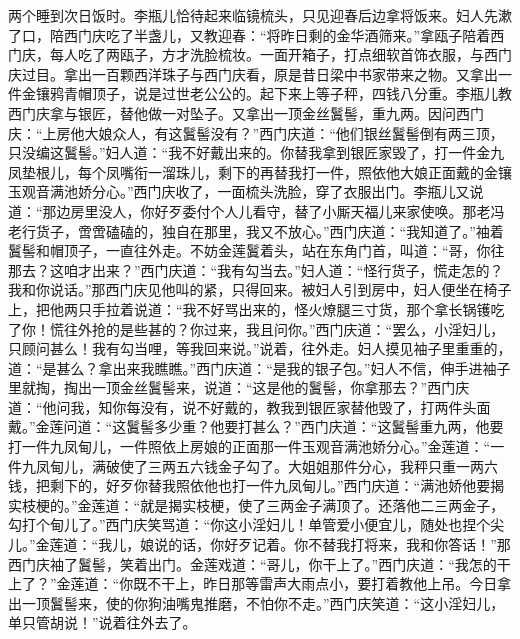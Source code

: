 两个睡到次日饭时。李瓶儿恰待起来临镜梳头，只见迎春后边拿将饭来。妇人先漱了口，陪西门庆吃了半盏儿，又教迎春：“将昨日剩的金华酒筛来。”拿瓯子陪着西门庆，每人吃了两瓯子，方才洗脸梳妆。一面开箱子，打点细软首饰衣服，与西门庆过目。拿出一百颗西洋珠子与西门庆看，原是昔日梁中书家带来之物。又拿出一件金镶鸦青帽顶子，说是过世老公公的。起下来上等子秤，四钱八分重。李瓶儿教西门庆拿与银匠，替他做一对坠子。又拿出一顶金丝鬒髻，重九两。因问西门庆：“上房他大娘众人，有这鬒髻没有？”西门庆道：“他们银丝鬒髻倒有两三顶，只没编这鬒髻。”妇人道：“我不好戴出来的。你替我拿到银匠家毁了，打一件金九凤垫根儿，每个凤嘴衔一溜珠儿，剩下的再替我打一件，照依他大娘正面戴的金镶玉观音满池娇分心。”西门庆收了，一面梳头洗脸，穿了衣服出门。李瓶儿又说道：“那边房里没人，你好歹委付个人儿看守，替了小厮天福儿来家使唤。那老冯老行货子，啻啻磕磕的，独自在那里，我又不放心。”西门庆道：“我知道了。”袖着鬒髻和帽顶子，一直往外走。不妨金莲鬒着头，站在东角门首，叫道：“哥，你往那去？这咱才出来？”西门庆道：“我有勾当去。”妇人道：“怪行货子，慌走怎的？我和你说话。”那西门庆见他叫的紧，只得回来。被妇人引到房中，妇人便坐在椅子上，把他两只手拉着说道：“我不好骂出来的，怪火燎腿三寸货，那个拿长锅镬吃了你！慌往外抢的是些甚的？你过来，我且问你。”西门庆道：“罢么，小淫妇儿，只顾问甚么！我有勾当哩，等我回来说。”说着，往外走。妇人摸见袖子里重重的，道：“是甚么？拿出来我瞧瞧。”西门庆道：“是我的银子包。”妇人不信，伸手进袖子里就掏，掏出一顶金丝鬒髻来，说道：“这是他的鬒髻，你拿那去？”西门庆道：“他问我，知你每没有，说不好戴的，教我到银匠家替他毁了，打两件头面戴。”金莲问道：“这鬒髻多少重？他要打甚么？”西门庆道：“这鬒髻重九两，他要打一件九凤甸儿，一件照依上房娘的正面那一件玉观音满池娇分心。”金莲道：“一件九凤甸儿，满破使了三两五六钱金子勾了。大姐姐那件分心，我秤只重一两六钱，把剩下的，好歹你替我照依他也打一件九凤甸儿。”西门庆道：“满池娇他要揭实枝梗的。”金莲道：“就是揭实枝梗，使了三两金子满顶了。还落他二三两金子，勾打个甸儿了。”西门庆笑骂道：“你这小淫妇儿！单管爱小便宜儿，随处也捏个尖儿。”金莲道：“我儿，娘说的话，你好歹记着。你不替我打将来，我和你答话！”那西门庆袖了鬒髻，笑着出门。金莲戏道：“哥儿，你干上了。”西门庆道：“我怎的干上了？”金莲道：“你既不干上，昨日那等雷声大雨点小，要打着教他上吊。今日拿出一顶鬒髻来，使的你狗油嘴鬼推磨，不怕你不走。”西门庆笑道：“这小淫妇儿，单只管胡说！”说着往外去了。

